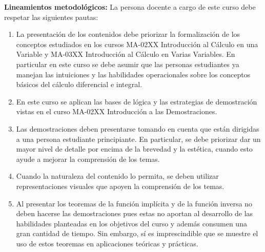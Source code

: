 \begin{refsection}
\noindent \textbf{Lineamientos metodológicos:} La persona docente a cargo de este curso debe respetar las siguientes pautas:
\begin{enumerate}
    \item La presentación de los contenidos debe priorizar la formalización de los conceptos estudiados en los cursos MA-02XX Introducción al Cálculo en una Variable y MA-03XX Introducción al Cálculo en Varias Variables. En particular en este curso se debe asumir que las personas estudiantes  ya manejan las intuiciones y las habilidades operacionales sobre los conceptos básicos del cálculo diferencial e integral.
    \item En este curso se aplican las bases de lógica y las estrategias de demostración vistas en el curso MA-02XX Introducción a las Demostraciones.
    \item Las demostraciones deben presentarse tomando en cuenta que están dirigidas a una persona estudiante principiante. En particular, se debe priorizar dar un mayor nivel de detalle por encima de la brevedad y la estética, cuando esto ayude a mejorar la comprensión de los temas.
    \item Cuando la naturaleza del contenido lo permita, se deben utilizar representaciones visuales que apoyen la comprensión de los temas.
    \item Al presentar los teoremas de la función implícita y de la función inversa no deben hacerse las demostraciones pues estas no aportan al desarrollo de las habilidades planteadas en los objetivos del curso y además consumen una gran cantidad de tiempo. Sin embargo, sí es imprescindible que se muestre el uso de estos teoremas en aplicaciones teóricas y prácticas.
\end{enumerate}


\end{refsection}
